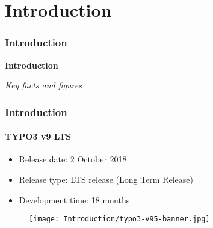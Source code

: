 %

\section{Introduction}
\begin{frame}[fragile]
	\frametitle{Introduction}

	\begin{center}\huge{\color{typo3darkgrey}\textbf{Introduction}}\end{center}
	\begin{center}\large{\textit{Key facts and figures}}\end{center}

\end{frame}


\begin{frame}[fragile]
	\frametitle{Introduction}
	\framesubtitle{TYPO3 v9 LTS}

	\begin{itemize}
		\item Release date: 2 October 2018
		\item Release type: LTS release (Long Term Release)
		\item Development time: 18 months
	\end{itemize}

	\begin{figure}
		\texttt{[image: Introduction/typo3-v95-banner.jpg]}
	\end{figure}

\end{frame}


